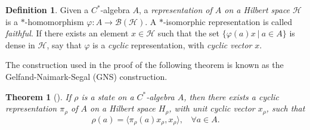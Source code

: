 \documentclass[12pt,a4paper]{report}
\theoremstyle{plain}
\newtheorem{thm}{Theorem}
\theoremstyle{definition}
\newtheorem{defn}{Definition}
\newcommand{\1}{\mathbbm{1}}
\renewcommand{\H}{\mathcal{H}}
\newcommand{\B}{\mathcal{B}}
\newcommand{\BH}{\mathcal{\B(\H)}}
\renewcommand{\phi}{\varphi}
\begin{document}
\begin{defn}
	Given a $C^\ast$-algebra $A$, a \emph{representation of $A$ on a Hilbert space $\H$} 
	is a $\ast$-homomorphism $\phi: A \to \BH$. 
	A $\ast$-isomorphic representation is called \emph{faithful}.
	If there exists an element $x\in\H$ such that the set $\{\phi(a)x ~|~ a\in A\}$ is dense in $\H$, 
	say that $\phi$ is a \emph{cyclic} representation, with \emph{cyclic vector} $x$.
\end{defn}	
The construction used in the proof of the following theorem is known as the Gelfand-Naimark-Segal (GNS)
construction.
\begin{thm}[{\cite[4.5.2]{kadison83}}]\label{thm:gns}
	If $\rho$ is a state on a $C^\ast$-algebra $A$, then there exists a cyclic representation 
	$\pi_\rho$ of $A$ on a Hilbert space ${H}_\rho$, with unit cyclic vector $x_\rho$, such that 
	\[ 
		\rho(a)= \langle \pi_\rho (a) x_\rho, x_\rho \rangle, ~~~~ \forall a \in A.
	\]
\end{thm}
\end{document}
